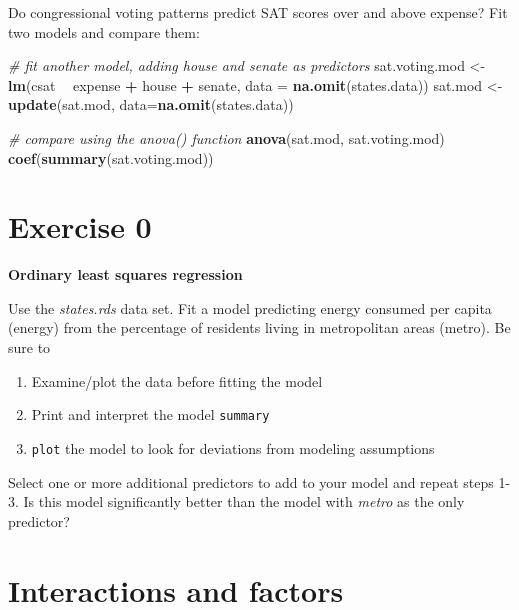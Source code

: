 \documentclass[]{book}
\newenvironment{Shaded}{\begin{snugshade}}{\end{snugshade}}
\newcommand{\KeywordTok}[1]{\textcolor[rgb]{0.13,0.29,0.53}{\textbf{#1}}}
\newcommand{\DataTypeTok}[1]{\textcolor[rgb]{0.13,0.29,0.53}{#1}}
\newcommand{\StringTok}[1]{\textcolor[rgb]{0.31,0.60,0.02}{#1}}
\newcommand{\CommentTok}[1]{\textcolor[rgb]{0.56,0.35,0.01}{\textit{#1}}}
\newcommand{\OperatorTok}[1]{\textcolor[rgb]{0.81,0.36,0.00}{\textbf{#1}}}
\newcommand{\NormalTok}[1]{#1}
\providecommand{\tightlist}{%
  \setlength{\itemsep}{0pt}\setlength{\parskip}{0pt}}
\begin{document}
Do congressional voting patterns predict SAT scores over and above
expense? Fit two models and compare them:

\begin{Shaded}
\begin{Highlighting}[]
  \CommentTok{# fit another model, adding house and senate as predictors}
\NormalTok{  sat.voting.mod <-}\StringTok{  }\KeywordTok{lm}\NormalTok{(csat }\OperatorTok{~}\StringTok{ }\NormalTok{expense }\OperatorTok{+}\StringTok{ }\NormalTok{house }\OperatorTok{+}\StringTok{ }\NormalTok{senate,}
                        \DataTypeTok{data =} \KeywordTok{na.omit}\NormalTok{(states.data))}
\NormalTok{  sat.mod <-}\StringTok{ }\KeywordTok{update}\NormalTok{(sat.mod, }\DataTypeTok{data=}\KeywordTok{na.omit}\NormalTok{(states.data))}

  \CommentTok{# compare using the anova() function}
  \KeywordTok{anova}\NormalTok{(sat.mod, sat.voting.mod)}
  \KeywordTok{coef}\NormalTok{(}\KeywordTok{summary}\NormalTok{(sat.voting.mod))}
\end{Highlighting}
\end{Shaded}

\section{Exercise 0}\label{exercise-0-1}

\textbf{Ordinary least squares regression}

Use the \emph{states.rds} data set. Fit a model predicting energy
consumed per capita (energy) from the percentage of residents living in
metropolitan areas (metro). Be sure to

\begin{enumerate}
\def\labelenumi{\arabic{enumi}.}
\tightlist
\item
  Examine/plot the data before fitting the model
\item
  Print and interpret the model \texttt{summary}
\item
  \texttt{plot} the model to look for deviations from modeling
  assumptions
\end{enumerate}

Select one or more additional predictors to add to your model and repeat
steps 1-3. Is this model significantly better than the model with
\emph{metro} as the only predictor?

\section{Interactions and factors}\label{interactions-and-factors}
\end{document}
